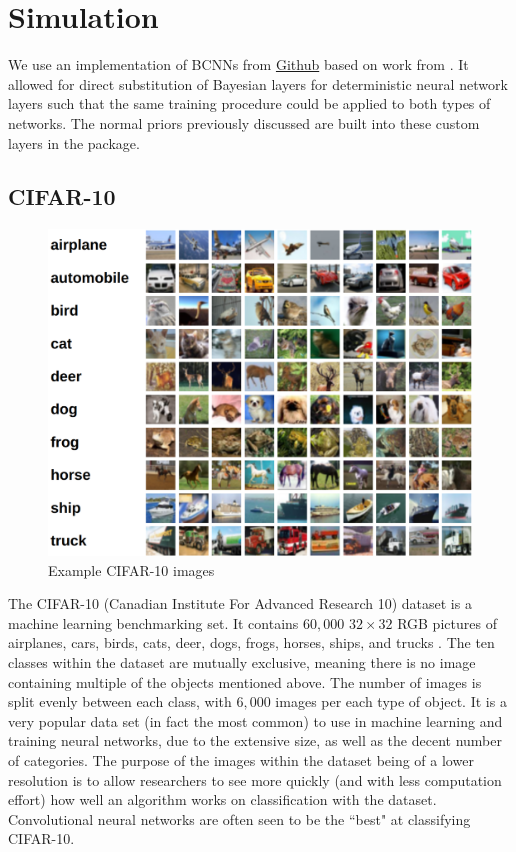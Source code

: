 \documentclass[12pt]{article}
\begin{document}
\section{Simulation}

We use an implementation of BCNNs from \href{https://github.com/kumar-shridhar/PyTorch-BayesianCNN}{Github} based on work from \cite{shridhar2019comprehensive} \cite{shridhar2018uncertainty}. It allowed for direct substitution of Bayesian layers for deterministic neural network layers such that the same training procedure could be applied to both types of networks. The normal priors previously discussed are built into these custom layers in the package. 

\subsection{CIFAR-10}

	\begin{figure}[H]
		\centering
	\includegraphics[width=.75\textwidth]{../Images/cifar-10.png}
	\caption{Example CIFAR-10 images \cite{cifar10}}
\end{figure}

The CIFAR-10 (Canadian Institute For Advanced Research 10) dataset is a machine learning benchmarking set. It contains $60,000$ $32 \times 32$ RGB pictures of airplanes, cars, birds, cats, deer, dogs, frogs, horses, ships, and trucks \cite{cifar10}. The ten classes within the dataset are mutually exclusive, meaning there is no image containing multiple of the objects mentioned above. The number of images is split evenly between each class, with $6,000$ images per each type of object. It is a very popular data set (in fact the most common) to use in machine learning and training neural networks, due to the extensive size, as well as the decent number of categories. The purpose of the images within the dataset being of a lower resolution is to allow researchers to see more quickly (and with less computation effort) how well an algorithm works on classification with the dataset. Convolutional neural networks are often seen to be the ``best" at classifying CIFAR-10.
\end{document}
